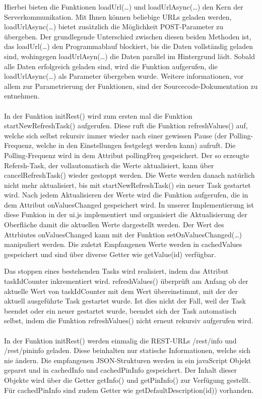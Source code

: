 Hierbei bieten die Funktionen \textrm{loadUrl(\ldots)} und
\textrm{loadUrlAsync(\ldots)} den Kern der Serverkommunikation. Mit Ihnen können
beliebige URLs geladen werden, \textrm{loadUrlAsync(\ldots)} bietet zusätzlich
die Möglichkeit POST-Parameter zu übergeben. Der grundlegende Unterschied
zwischen diesen beiden Methoden ist, das \textrm{loadUrl(\ldots)} den
Programmablauf blockiert, bis die Daten vollständig geladen sind, wohingegen
\textrm{loadUrlAsyn(\ldots)} die Daten parallel im Hintergrund lädt. Sobald alle
Daten erfolgreich geladen sind, wird die Funktion aufgerufen, die
\textrm{loadUrlAsync(\ldots)} als Parameter übergeben wurde. Weitere
informationen, vor allem zur Parametrierung der Funktionen, sind der
Sourcecode-Dokumentation zu entnehmen.\\
\\
In der Funktion \textrm{initRest()} wird zum ersten mal die Funktion
\textrm{startNewRefreshTask()} aufgerufen. Diese ruft die Funktion
\textrm{refreshValues()} auf, welche sich selbst rekursiv immer wieder nach
einer gewissen Pause (der Polling-Frequenz, welche in den Einstellungen
festgelegt werden kann) aufruft. Die Polling-Frequenz wird in dem Attribut
\textrm{pollingFreq} gespeichert. Der so erzeugte Refersh-Task, der
vollautomatisch die Werte aktualisiert, kann über \textrm{cancelRefreshTask()}
wieder gestoppt werden. Die Werte werden danach natürlich nicht mehr
aktualisiert, bis mit \textrm{startNewRefreshTask()} ein neuer Task gestartet
wird. Nach jedem Aktualisieren der Werte wird die Funktion aufgerufen, die in
dem Attribut \textrm{onValuesChanged} gespeichert wird. In unserer
Implementierung ist diese Funkion in der \textrm{ui.js} implementiert und
organisiert die Aktualisierung der Oberfläche damit die aktuellen Werte
dargestellt werden. Der Wert des Attrbiutes \textrm{onValuesChanged} kann mit
der Funktion \textrm{setOnValuesChanged(\ldots)} manipuliert werden. Die zuletzt
Empfangenen Werte werden in \textrm{cachedValues} gespeichert und sind über
diverse Getter wie \textrm{getValue(id)} verfügbar.

Das stoppen eines bestehenden Tasks wird realisiert, indem das Attribut
\textrm{taskIdCounter} inkrementiert wird. \textrm{refreshValues()} überprüft am
Anfang ob der aktuelle Wert von \textrm{taskIdCounter} mit dem Wert
übereinstimmt, mit der der aktuell ausgeführte Task gestartet wurde. Ist dies
nicht der Fall, weil der Task beendet oder ein neuer gestartet wurde, beendet
sich der Task automatisch selbst, indem die Funktion \textrm{refreshValues()}
nicht erneut rekursiv aufgerufen wird.\\
\\
In der Funktion \textrm{initRest()} werden einmalig die REST-URLs
\textrm{/rest/info} und \textrm{/rest/pininfo} geladen. Diese beinhalten nur
statische Informationen, welche sich nie ändern. Die empfangenen JSON-Strukturen
werden in ein javaScript Objekt geparst und in \textrm{cachedInfo} und
\textrm{cachedPinInfo} gespeichert. Der Inhalt dieser Objekte wird über
die Getter \textrm{getInfo()} und \textrm{getPinInfo()} zur Verfügung gestellt.
Für \textrm{cachedPinInfo} sind zudem Getter wie
\textrm{getDefaultDescription(id))} vorhanden.


